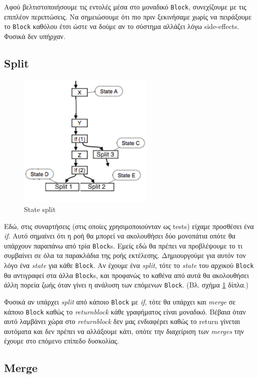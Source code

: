 Αφού βελτιστοποιήσουμε τις εντολές μέσα στο μοναδικό \texttt{Block}, συνεχίζουμε
με τις επιπλέον περιπτώσεις. Να σημειώσουμε ότι πιο πριν ξεκινήσαμε χωρίς να
πειράξουμε το \texttt{Block} καθόλου έτσι ώστε να δούμε αν το σύστημα αλλάζει
λόγω side-effects. Φυσικά δεν υπήρχαν.

\subsection{Split}

\begin{figure}
\caption{State split}
\label{wrapped-figure}
\includegraphics[width=6.5cm]{split-state.png}
\end{figure} 

Εδώ, στις συναρτήσεις (στις οποίες χρησιμοποιούνταν ως tests) είχαμε προσθέσει ένα
\textit{if}. Αυτό σημαίνει ότι η ροή θα μπορεί να ακολουθήσει δύο μονοπάτια
οπότε θα υπάρχουν παραπάνω από τρία \texttt{Block}s. Εμείς εδώ θα πρέπει να
προβλέψουμε το τι συμβαίνει σε όλα τα παρακλάδια της ροής εκτέλεσης.
Δημιουργούμε για αυτόν τον λόγο ένα \textit{state} για κάθε \texttt{Block}. Αν
έχουμε ένα \textit{split}, τότε το \textit{state} του αρχικού \texttt{Block} θα
αντιγραφεί στα άλλα \texttt{Block}s, και προφανώς το καθένα από αυτά θα
ακολουθήσει άλλη πορεία ζωής όταν γίνει η ανάλυση των επόμενων \texttt{Block}.
(Βλ. σχήμα \ref{wrapped-figure} δίπλα.)

Φυσικά αν υπάρχει \textit{split} από κάποιο \texttt{Block} με \textit{if}, τότε
θα υπάρχει και \textit{merge} σε κάποιο \texttt{Block} καθώς το
\textit{returnblock} κάθε γραφήματος είναι μοναδικό. Βέβαια όταν αυτό λαμβάνει
χώρα στο \textit{returnblock} δεν μας ενδιαφέρει καθώς το return γίνεται
αυτόματα και δεν πρέπει να αλλάξουμε κάτι, οπότε την διαχείριση των
\textit{merges} την έχουμε στο επόμενο επίπεδο δυσκολίας.

\subsection{Merge}

